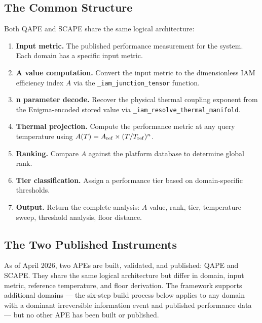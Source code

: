 \documentclass[12pt,a4paper]{article}
\begin{document}
\subsection{The Common Structure}

Both QAPE and SCAPE share the same logical architecture:

\begin{enumerate}[leftmargin=1.5em]
\item \textbf{Input metric.} The published performance measurement for the
system. Each domain has a specific input metric.

\item \textbf{A value computation.} Convert the input metric to the
dimensionless IAM efficiency index $A$ via the \texttt{\_iam\_junction\_tensor}
function.

\item \textbf{n parameter decode.} Recover the physical thermal coupling
exponent from the Enigma-encoded stored value via \texttt{\_iam\_resolve\_thermal\_manifold}.

\item \textbf{Thermal projection.} Compute the performance metric at any
query temperature using $A(T) = A_{\rm ref} \times (T/T_{\rm ref})^n$.

\item \textbf{Ranking.} Compare $A$ against the platform database to
determine global rank.

\item \textbf{Tier classification.} Assign a performance tier based on
domain-specific thresholds.

\item \textbf{Output.} Return the complete analysis: $A$ value, rank, tier,
temperature sweep, threshold analysis, floor distance.
\end{enumerate}

\subsection{The Two Published Instruments}

As of April 2026, two APEs are built, validated, and published: QAPE and SCAPE.
They share the same logical architecture but differ in domain, input metric,
reference temperature, and floor derivation. The framework supports additional
domains --- the six-step build process below applies to any domain with a
dominant irreversible information event and published performance data --- but
no other APE has been built or published.
\end{document}
